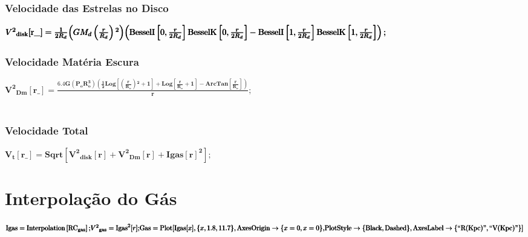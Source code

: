 \documentclass{article}
\begin{document}
\subsubsection*{Velocidade das Estrelas no Disco}

\begin{doublespace}
\noindent\(\pmb{V^2{}_{\text{disk}}[\text{r$\_$}]=}\\
\pmb{\frac{1}{2 R_d}}\\
\pmb{\left(G M_d \left(\frac{r}{R_d}\right){}^2\right) }\\
\pmb{\left(\text{BesselI}\left[0,\frac{r}{2 R_d}\right] \text{BesselK}\left[0,\frac{r}{2 R_d}\right]-\right.}\\
\pmb{\left.\text{BesselI}\left[1,\frac{r}{2 R_d}\right] \text{BesselK}\left[1,\frac{r}{2 R_d}\right]\right);}\)
\end{doublespace}

\subsubsection*{Velocidade Mat{\' e}ria Escura}

\begin{doublespace}
\noindent\(\pmb{V^2{}_{\text{Dm}}[\text{r$\_$}]=\frac{6.4 G \left(P_o R_o^3\right) \left(\frac{1}{2} \text{Log}\left[\left(\frac{r}{R_o}\right){}^2+1\right]+\text{Log}\left[\frac{r}{R_o}+1\right]-\text{ArcTan}\left[\frac{r}{R_o}\right]\right)}{r};}\)
\end{doublespace}

\subsubsection*{\\
Velocidade Total}

\begin{doublespace}
\noindent\(\pmb{V_t[\text{r$\_$}]=\text{Sqrt}\left[V^2{}_{\text{disk}}[r]+V^2{}_{\text{Dm}}[r]+\text{Igas}[r]^2\right];}\)
\end{doublespace}

\section*{Interpola{\c c}{\~ a}o do G{\' a}s}

\begin{doublespace}
\noindent\(\pmb{\text{Igas}=\text{Interpolation}\left[\text{RC}_{\text{gas}}\right];}\\
\pmb{V^2{}_{\text{gas}}=\text{Igas}^2[r];}\\
\pmb{\text{Gas}= \text{Plot}[\text{Igas}[x],\{x,1.8,11.7\},\text{AxesOrigin}\to \{x=0,x=0\},}\\
\pmb{\text{PlotStyle}\to \{\text{Black},\text{Dashed}\},\text{AxesLabel}\to \{\text{{``}R(Kpc){''}},\text{{``}V(Kpc){''}}\}]}\)
\end{doublespace}
\end{document}
